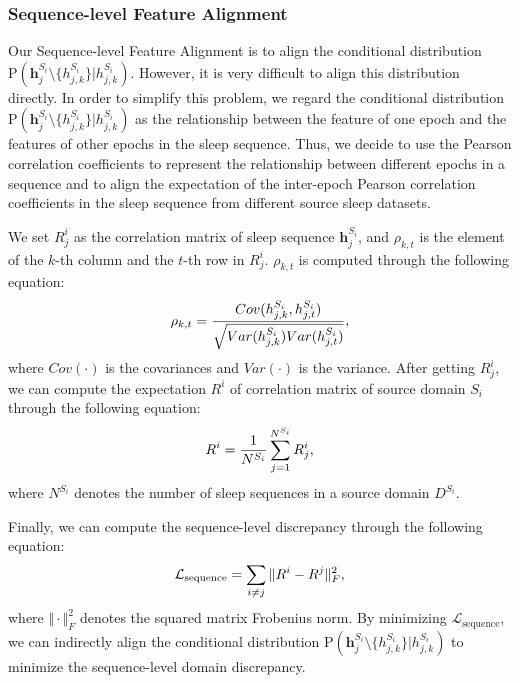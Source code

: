 \documentclass[letterpaper]{article} %
\begin{document}
	\subsubsection{Sequence-level Feature Alignment}
	Our Sequence-level Feature Alignment is to align the conditional distribution $\mathrm{P}(\mathrm{\mathbf{h}}^{S_i}_j\setminus \{h^{S_i}_{j, k}\}|h^{S_i}_{j, k})$.
	However, it is very difficult to align this distribution directly.
	In order to simplify this problem, we regard the conditional distribution $\mathrm{P}(\mathrm{\mathbf{h}}^{S_i}_j\setminus \{h^{S_i}_{j, k}\}|h^{S_i}_{j, k})$ as the relationship between the feature of one epoch and the features of other epochs in the sleep sequence.
	Thus, we decide to use the Pearson correlation coefficients to represent the relationship between different epochs in a sequence and to align the expectation of the inter-epoch Pearson correlation coefficients in the sleep sequence from different source sleep datasets.
	
	
	We set $R^i_j$ as the correlation matrix of sleep sequence $\mathrm{\mathbf{h}}^{S_i}_j$, and $\rho_{k, t}$ is the element of the $k$-th column and the $t$-th row in $R^i_j$.
	$\rho_{k, t}$ is computed through the following equation:
	\begin{equation}
		\small
		\rho_{k, t}=\frac{Cov(h^{S_i}_{j, k}, h^{S_i}_{j, t})}{\sqrt{Var(h^{S_i}_{j, k})Var(h^{S_i}_{j, t})}},
	\end{equation}
	where $Cov(\cdot)$ is the covariances and $Var(\cdot)$ is the variance.
	After getting $R^i_j$, we can compute the expectation $R^i$ of correlation matrix of source domain $S_i$ through the following equation:
	\begin{equation}
		\small
		R^i = \frac{1}{N^{S_i}} \sum_{j=1}^{N^{S_i}} R^i_j,
	\end{equation}
	where $N^{S_i}$ denotes the number of sleep sequences in a source domain $D^{S_i}$.
	
	Finally, we can compute the sequence-level discrepancy through the following equation:
	\begin{equation}
		\label{eq:sequence}
		\small
		\mathcal{L}_{\mathrm{sequence}} =  \sum_{i \neq j}\Vert R^i - R^j \Vert^2_F,
	\end{equation}
	where $\Vert \cdot \Vert^2_F$ denotes the squared matrix Frobenius norm.
	By minimizing $\mathcal{L}_{\mathrm{sequence}}$, we can indirectly align the conditional distribution $\mathrm{P}(\mathrm{\mathbf{h}}^{S_i}_j\setminus \{h^{S_i}_{j, k}\}|h^{S_i}_{j, k})$ to minimize the sequence-level domain discrepancy. 
	
\end{document}
